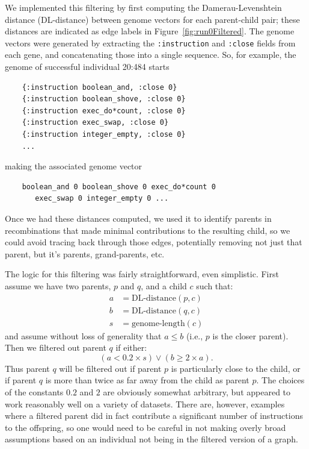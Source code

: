 We implemented this filtering by first computing the Damerau-Levenshtein 
distance (DL-distance)
between genome vectors for each parent-child pair; these distances
are indicated as edge labels in Figure~\ref{fig:run0Filtered}. The genome
vectors were generated by extracting the \texttt{:instruction} and 
\texttt{:close} fields from each gene, and concatenating those into a
single sequence. So, for example, the genome of successful individual
20:484 starts

\begin{verbatim}
	{:instruction boolean_and, :close 0} 
	{:instruction boolean_shove, :close 0} 
	{:instruction exec_do*count, :close 0} 
	{:instruction exec_swap, :close 0} 
	{:instruction integer_empty, :close 0}
	...
\end{verbatim}

making the associated genome vector

\begin{verbatim}
	boolean_and 0 boolean_shove 0 exec_do*count 0 
	   exec_swap 0 integer_empty 0 ...
\end{verbatim}

Once we had these distances computed, we used it to identify parents in
recombinations that made minimal contributions to the resulting child, so
we could avoid tracing back through those edges, potentially removing not
just that parent, but it's parents, grand-parents, etc. 

The logic for this filtering was fairly straightforward, even simplistic.
First assume we have two parents, $p$ and $q$, and a child $c$ such that:
\begin{align*}
	a & = \textrm{DL-distance}(p, c) \\
	b & = \textrm{DL-distance}(q, c) \\
	s & = \textrm{genome-length}(c)
\end{align*}
and assume without loss of generality that $a \leq b$ (i.e., $p$ is the
closer parent). Then we filtered out parent $q$ if either:
\[
	(a < 0.2 \times s) \lor (b \geq 2 \times a).
\]
Thus parent $q$ will be filtered out if parent $p$ is particularly close to
the child, or if parent $q$ is more than twice as far away from the child as
parent $p$. The choices of the constants $0.2$ and $2$ are obviously somewhat
arbitrary, but appeared to work reasonably well on a variety of datasets. 
There are,
however, examples where a filtered parent did in fact contribute a significant
number of instructions to the offspring, so one would need to be careful in not
making overly broad assumptions based on an individual not being in the filtered
version of a graph.

